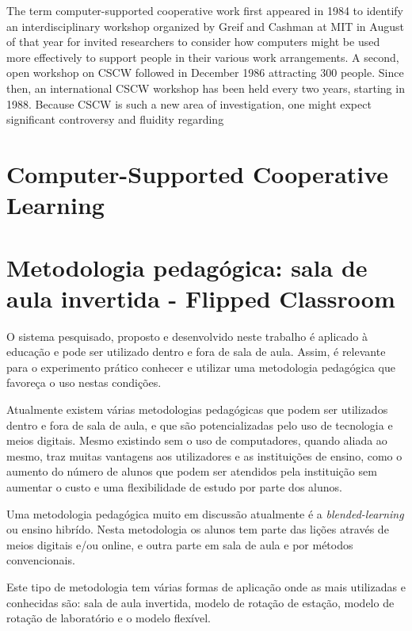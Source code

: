 The term computer-supported cooperative work first appeared
in 1984 to identify an interdisciplinary workshop
organized by Greif and Cashman at MIT in August of
that year for invited researchers to consider how computers
might be used more effectively to support people
in their various work arrangements. A second, open workshop
on CSCW followed in December 1986 attracting
300 people. Since then, an international CSCW workshop
has been held every two years, starting in 1988.
Because CSCW is such a new area of investigation, one
might expect significant controversy and fluidity regarding

\section{Computer-Supported Cooperative Learning}

\section{Metodologia pedagógica: sala de aula invertida - Flipped Classroom}
\label{sec:flipped}


O sistema pesquisado, proposto e desenvolvido neste trabalho é aplicado à educação e pode ser utilizado dentro e fora de sala de aula. Assim, é relevante para o experimento prático conhecer e utilizar uma metodologia pedagógica que favoreça o uso nestas condições.

Atualmente existem várias metodologias pedagógicas que podem ser utilizados dentro e fora de sala de aula, e que são potencializadas pelo uso de tecnologia e meios digitais. Mesmo existindo sem o uso de computadores, quando aliada ao mesmo, traz muitas vantagens aos utilizadores e as instituições de ensino, como o aumento do número de alunos que podem ser atendidos pela instituição sem aumentar o custo e uma flexibilidade de estudo por parte dos alunos. 

Uma metodologia pedagógica muito em discussão atualmente é a \emph{blended-learning} ou ensino hibrído. Nesta metodologia os alunos tem parte das lições através de meios digitais e/ou online, e outra parte em sala de aula e por métodos convencionais.

Este tipo de metodologia tem várias formas de aplicação onde as mais utilizadas e conhecidas são: sala de aula invertida, modelo de rotação de estação, modelo de rotação de laboratório e o modelo flexível.




